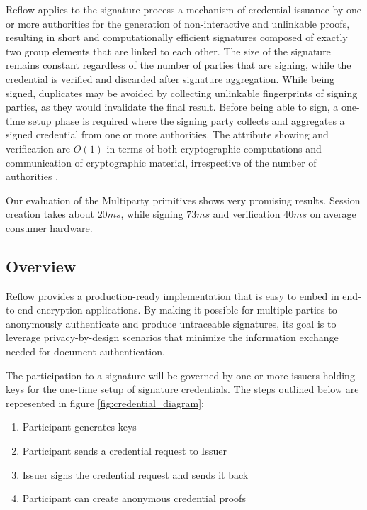 \documentclass[twocolumn]{article}
\begin{document}
Reflow applies to the signature process a mechanism of credential
issuance by one or more authorities for the generation of
non-interactive and unlinkable proofs, resulting in short and
computationally efficient signatures composed of exactly two group
elements that are linked to each other. The size of the signature
remains constant regardless of the number of parties that are signing,
while the credential is verified and discarded after signature
aggregation. While being signed, duplicates may be avoided by collecting
unlinkable fingerprints of signing parties, as they would invalidate the
final result. Before being able to sign, a one-time setup phase is
required where the signing party collects and aggregates a signed
credential from one or more authorities. The attribute showing and
verification are $O(1)$ in terms of both cryptographic computations and
communication of cryptographic material, irrespective of the number of
authorities \citep{coconut-2018}.

Our evaluation of the Multiparty primitives shows very promising
results. Session creation takes about $20ms$, while signing $73ms$ and
verification $40ms$ on average consumer hardware.

\subsection*{Overview}

Reflow provides a production-ready implementation that is easy to embed in end-to-end encryption applications. By making it possible for multiple parties to anonymously authenticate and produce untraceable signatures, its goal is to leverage privacy-by-design scenarios that minimize the information exchange needed for document authentication.

The participation to a signature will be governed by one or more issuers holding keys for the one-time setup of signature credentials. The steps outlined below are represented in figure \ref{fig:credential_diagram}:

\begin{enumerate} %
  \item Participant generates keys
  \item Participant sends a credential request to Issuer
  \item Issuer signs the credential request and sends it back
  \item Participant can create anonymous credential proofs
\end{enumerate}
\end{document}

